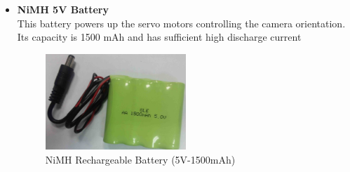 \documentclass[12pt]{article}
\begin{document}
\begin{itemize}
	\item \textbf{NiMH 5V Battery}\\
	This battery powers up the servo motors controlling the camera orientation. Its capacity is 1500 mAh and has sufficient high discharge current
	\begin{figure}[H]
		\centering
		\includegraphics[width =0.5\textwidth]{Fig/Electronics/bat5.jpg}
		\caption{NiMH Rechargeable Battery (5V-1500mAh)}
		\label{fig:bat5}
	\end{figure}
	
\end{itemize}
\end{document}

